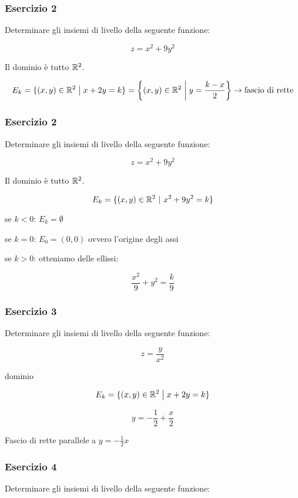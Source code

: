 \subsubsection*{Esercizio 2}

Determinare gli insiemi di livello della seguente funzione:

\[
    z = x^{2}+9y^{2}
\]

Il dominio è tutto \(\R^2\).

\[
    E_k = \{(x,y) \in \R^2 \giventhat x+2y = k\} = \left\{(x,y) \in \R^2 \giventhat[\bigg] y = \frac{k-x}{2}\right\} \to \text{fascio di rette}
\]

\filbreak{}
\subsubsection*{Esercizio 2}

Determinare gli insiemi di livello della seguente funzione:

\[
    z = x^{2}+9y^{2}
\]

Il dominio è tutto \(\R^2\).

\[
    E_k = \{(x,y) \in \R^{2}\ \vert\ x^{2}+9y^{2}=k\}
\]

se \(k<0\): \(E_k = \emptyset \)

se \(k=0\): \(E_0=(0,0)\) ovvero l'origine degli assi

se \(k>0\): otteniamo delle ellissi:

\[
    \frac{x^{2}}{9}+ y^{2} = \frac{k}{9}
\]

\filbreak{}
\subsubsection*{Esercizio 3}

Determinare gli insiemi di livello della seguente funzione:

\[
    z= \frac{y}{x^{2}}
\]

dominio

\[
    E_k = \{(x,y) \in \R^{2} \giventhat x+2y=k\}
\]

\[
    y=-\frac{1}{2} + \frac{x}{2}
\]

Fascio di rette parallele a \(y = -\frac{1}{2}x\)

\filbreak{}
\subsubsection*{Esercizio 4}

Determinare gli insiemi di livello della seguente funzione:

